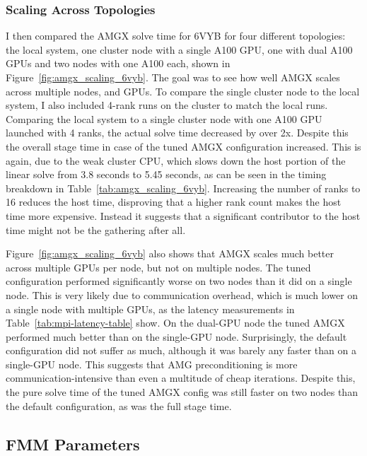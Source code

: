 


\subsubsection{Scaling Across Topologies}

I then compared the AMGX solve time for 6VYB for four different topologies: the local system, one cluster node with a single A100 GPU, one with dual A100 GPUs and two nodes with one A100 each, shown in Figure~\ref{fig:amgx_scaling_6vyb}.
The goal was to see how well AMGX scales across multiple nodes, and GPUs.
To compare the single cluster node to the local system, I also included 4-rank runs on the cluster to match the local runs.
Comparing the local system to a single cluster node with one A100 GPU launched with 4 ranks, the actual solve time decreased by over 2x.
Despite this the overall stage time in case of the tuned AMGX configuration increased.
This is again, due to the weak cluster CPU, which slows down the host portion of the linear solve from 3.8 seconds to 5.45 seconds, as can be seen in the timing breakdown in Table~\ref{tab:amgx_scaling_6vyb}.
Increasing the number of ranks to 16 reduces the host time, disproving that a higher rank count makes the host time more expensive.
Instead it suggests that a significant contributor to the host time might not be the gathering after all.

Figure~\ref{fig:amgx_scaling_6vyb} also shows that AMGX scales much better across multiple GPUs per node, but not on multiple nodes.
The tuned configuration performed significantly worse on two nodes than it did on a single node.
This is very likely due to communication overhead, which is much lower on a single node with multiple GPUs, as the latency measurements in Table~\ref{tab:mpi-latency-table} show.
On the dual-GPU node the tuned AMGX performed much better than on the single-GPU node.
Surprisingly, the default configuration did not suffer as much, although it was barely any faster than on a single-GPU node.
This suggests that AMG preconditioning is more communication-intensive than even a multitude of cheap iterations.
Despite this, the pure solve time of the tuned AMGX config was still faster on two nodes than the default configuration, as was the full stage time.



\FloatBarrier

\subsection{FMM Parameters}
\label{sec:evaluation-results-fmm-parameters}

